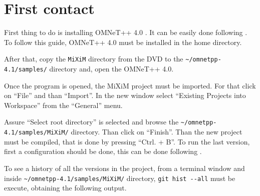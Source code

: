 \section{First contact}

First thing to do is installing \ac{OMNeT++} 4.0 \cite{OMNeT}. It can be easily done following \cite{installationomnet}. To follow this guide, 
\ac{OMNeT++} 4.0 must be installed in the home directory.

After that, copy the \verb|MiXiM| directory from the \ac{DVD} to the \verb|~/omnetpp-4.1/samples/| directory and, open the \ac{OMNeT++} 4.0.

Once the program is opened, the MiXiM project must be imported. For that click on ``File'' and than ``Import''. In the new window select 
``Existing Projects into Workspace'' from the ``General'' menu.

Assure ``Select root directory'' is selected and browse the 
\verb|~/omnetpp-4.1/samples/MiXiM/| directory. Than click on ``Finish''. Than the new project must be compiled, that is done by pressing ``Ctrl. + B''.
To run the last version, first a configuration should be done, this can be done following \cite{manualomnet}.

To see a history of all the versions in the project, from a terminal window and inside \verb|~/omnetpp-4.1/samples/MiXiM/| directory, \verb|git hist --all|
must be execute, obtaining the following output.

